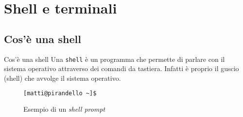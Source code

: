 \section{Shell e terminali}

\subsection{Cos'è una shell}

\begin{frame}[fragile]{Cos'è una shell}
  Una \texttt{shell} è un programma che permette di parlare con il sistema 
  operativo attraverso dei comandi da tastiera.
  Infatti è proprio il guscio (shell) che avvolge il sistema operativo.\bigskip
  \begin{figure}
        \begin{lstlisting}
[matti@pirandello ~]$
    \end{lstlisting}
    \caption{Esempio di un \textit{shell prompt}}
  \end{figure}
\end{frame}